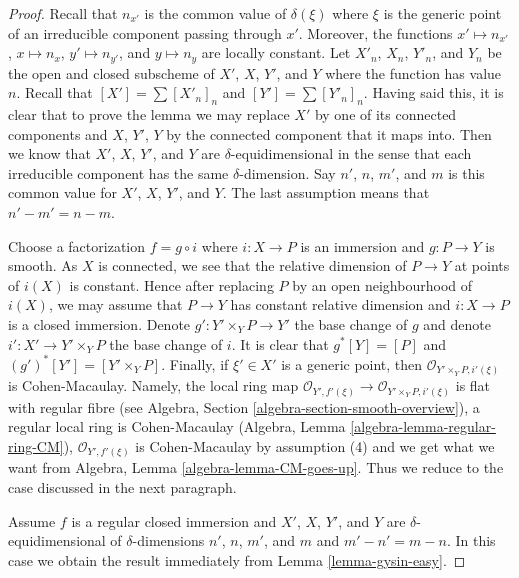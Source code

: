 \begin{proof}
Recall that $n_{x'}$ is the common value of $\delta(\xi)$
where $\xi$ is the generic point of an irreducible component
passing through $x'$. Moreover, the functions
$x' \mapsto n_{x'}$, $x \mapsto n_x$, $y' \mapsto n_{y'}$, and
$y \mapsto n_y$ are locally constant. Let $X'_n$, $X_n$, $Y'_n$,
and $Y_n$ be the open and closed subscheme of $X'$, $X$, $Y'$, and
$Y$ where the function has value $n$. Recall that
$[X'] = \sum [X'_n]_n$ and $[Y'] = \sum [Y'_n]_n$.
Having said this, it is clear that to prove the lemma we
may replace $X'$ by one of its connected components
and $X$, $Y'$, $Y$ by the connected component that
it maps into. Then we know that $X'$, $X$, $Y'$, and
$Y$ are $\delta$-equidimensional in the sense that
each irreducible component has the same $\delta$-dimension.
Say $n'$, $n$, $m'$, and $m$ is this common value
for $X'$, $X$, $Y'$, and $Y$. The last assumption
means that $n' - m' = n - m$.

\medskip\noindent
Choose a factorization $f = g \circ i$ where $i : X \to P$
is an immersion and $g : P \to Y$ is smooth. As $X$ is connected,
we see that the relative dimension of $P \to Y$ at points of $i(X)$
is constant. Hence after replacing $P$ by an open neighbourhood
of $i(X)$, we may assume that $P \to Y$ has constant relative dimension
and $i : X \to P$ is a closed immersion.
Denote $g' : Y' \times_Y P \to Y'$ the base change of $g$ and denote
$i' : X' \to Y' \times_Y P$ the base change of $i$.
It is clear that $g^*[Y] = [P]$ and $(g')^*[Y'] = [Y' \times_Y P]$.
Finally, if $\xi' \in X'$ is a generic point, then
$\mathcal{O}_{Y' \times_Y P, i'(\xi)}$ is Cohen-Macaulay.
Namely, the local ring map
$\mathcal{O}_{Y', f'(\xi)} \to \mathcal{O}_{Y' \times_Y P, i'(\xi)}$
is flat with regular fibre
(see Algebra, Section \ref{algebra-section-smooth-overview}),
a regular local ring is Cohen-Macaulay
(Algebra, Lemma \ref{algebra-lemma-regular-ring-CM}),
$\mathcal{O}_{Y', f'(\xi)}$ is Cohen-Macaulay by assumption
(4) and we get what we want from
Algebra, Lemma \ref{algebra-lemma-CM-goes-up}.
Thus we reduce to the case discussed in the next paragraph.

\medskip\noindent
Assume $f$ is a regular closed immersion and $X'$, $X$, $Y'$, and
$Y$ are $\delta$-equidimensional of $\delta$-dimensions
$n'$, $n$, $m'$, and $m$ and $m' - n' = m - n$.
In this case we obtain the result immediately from
Lemma \ref{lemma-gysin-easy}.
\end{proof}













